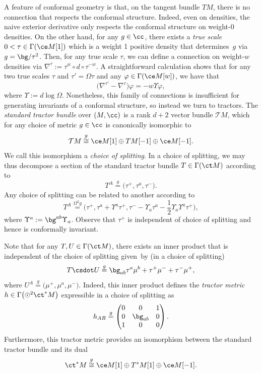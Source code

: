 A feature of conformal geometry is that, on the tangent bundle $TM$, there is no connection that respects the conformal structure. Indeed, even on densities, the naive exterior derivative only respects the conformal structure on weight-0 densities. On the other hand, for any $g \in \cc$, there exists a \textit{true scale} $0<\tau \in \Gamma(\ce M[1])$ which is a weight 1 positive density that determines~$g$ via~$g = \bg/\tau^2$. Then, for any true scale $\tau$, we can define a connection on weight-$w$ densities via $\nabla^\tau := \tau^w \circ d \circ \tau^{-w}$. A straightforward calculation shows that for any two true scales $\tau$ and $\tau' = \Omega \tau$ and any $\varphi \in \Gamma(\ce M[w])$, we have that
\[\bigl(\nabla^{\tau'} - \nabla^{\tau}\bigr) \varphi = -w \Upsilon \varphi ,\]
where $\Upsilon := d \log \Omega$. Nonetheless, this family of connections is insufficient for generating invariants of a conformal structure, so instead we turn to tractors. The \textit{standard tractor bundle} over $(M,\cc)$ is a rank $d+2$ vector bundle $\mathcal{T} M$, which for any choice of metric $g \in \cc$ is canonically isomorphic to
\[\mathcal{T}M \stackrel{g}{\cong} \ce M[1] \oplus TM[-1] \oplus \ce M[-1] .\]
We call this isomorphism a \textit{choice of splitting}. In a choice of splitting, we may thus decompose a section of the standard tractor bundle $T \in \Gamma(\ct M)$ according to
\[T^A \stackrel{g}{=} \bigl(\tau^+, \tau^a, \tau^-\bigr) .\]
Any choice of splitting can be related to another according to
\[T^A \stackrel{\Omega^2 g}{=} \biggl(\tau^+, \tau^a + \Upsilon^a \tau^+, \tau^- - \Upsilon_a \tau^a - \frac{1}{2} \Upsilon_a \Upsilon^a \tau^+\biggr) ,\]
where $\Upsilon^a := \bg^{ab} \Upsilon_a$. Observe that $\tau^+$ is independent of choice of splitting and hence is conformally invariant.

Note that for any $T,U \in \Gamma(\ct M)$, there exists an inner product that is independent of the choice of splitting given~by
(in a choice of splitting)
\[T \csdot U \stackrel{g}{=} \bg_{ab} \tau^a \mu^b + \tau^+ \mu^- + \tau^- \mu^+ ,\]
where $U^A \stackrel{g}{=} \bigl(\mu^+, \mu^a, \mu^-\bigr)$. Indeed, this inner product defines the \textit{tractor metric} $h \in \Gamma\bigl( \odot^2 \ct^* M\bigr)$ expressible in a choice of splitting as
\[h_{AB} \stackrel{g}{=} \begin{pmatrix}
0 & 0 & 1 \\
0 & \bg_{ab} & 0 \\
1 & 0 & 0
\end{pmatrix} .\]
Furthermore, this tractor metric provides an isomorphism between the standard tractor bundle and its dual
\[\ct^* M \stackrel{g}{\cong} \ce M[1] \oplus T^* M[1] \oplus \ce M[-1] .\]

